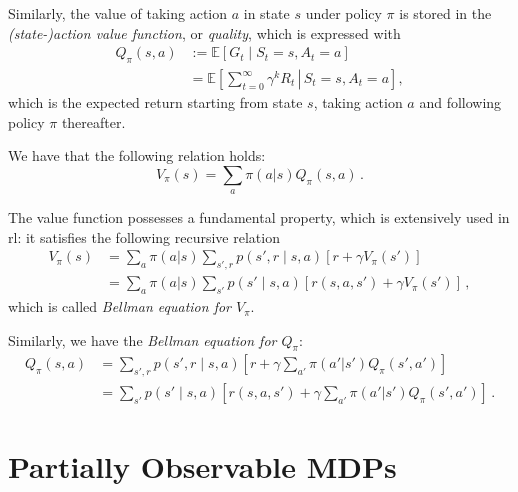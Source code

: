 Similarly, the value of taking action $a$ in state $s$ under policy $\pi$ is stored in the \emph{(state-)action value function}, or \emph{quality}, which is expressed with
\begin{equation}
    \begin{aligned}
        Q_\pi(s,a)
        &:= \mathbb E \left[ G_t \mid S_t = s, A_t = a \right] \\
        &= \mathbb E \left[ \left. \sum_{t=0}^\infty \gamma^k R_t \, \right| \, S_t = s, A_t = a \right],
    \end{aligned}
    \label{eq:Q}
\end{equation}
which is the expected return starting from state $s$, taking action $a$ and following policy $\pi$ thereafter.

We have that the following relation holds:
\begin{equation}
    V_\pi(s) = \sum_a \pi(a|s) Q_\pi(s,a) \, .
\end{equation}

The value function possesses a fundamental property, which is extensively used in \acrshort{rl}: it satisfies the following recursive relation
\begin{equation}
    \begin{aligned}
        V_\pi (s)
        &= \sum_a \pi(a|s) \sum_{s', r} p(s', r \mid s, a) \left[ r + \gamma V_\pi (s') \right] \\
        &= \sum_a \pi(a|s) \sum_{s'} p(s' \mid s, a) \left[ r(s,a,s') + \gamma V_\pi (s') \right] \, ,
    \end{aligned}
\end{equation}
which is called \emph{Bellman equation for $V_\pi$}.

Similarly, we have the \emph{Bellman equation for $Q_\pi$}:
\begin{equation}
    \begin{aligned}
        Q_\pi (s, a)
        &= \sum_{s', r} p(s', r \mid s, a) \left[ r + \gamma \sum_{a'} \pi(a'|s')  Q_\pi (s', a') \right] \\
        &= \sum_{s'} p(s' \mid s, a) \left[ r(s,a,s') + \gamma \sum_{a'} \pi(a'|s')  Q_\pi (s', a') \right] \, .
    \end{aligned}
    \label{eq:Q-recursive}
\end{equation}


\section{Partially Observable MDPs}

